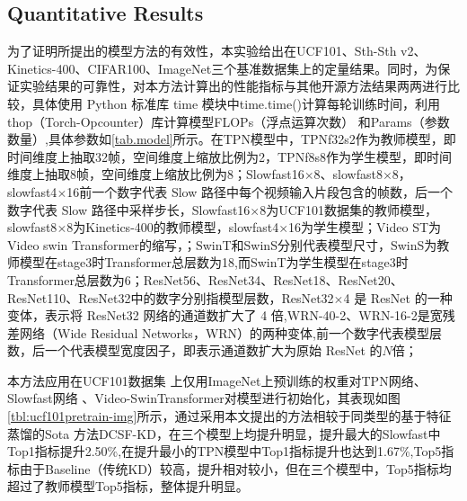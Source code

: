 \documentclass[10.5pt,letterpaper]{article}
\begin{document}
\subsection{ Quantitative Results}
为了证明所提出的模型方法的有效性，本实验给出在UCF101\cite{soomro-arxiv2012-ucf101}、Sth-Sth v2\cite{goyal-iccv2017-sthsth}、Kinetics-400\cite{kay-arXiv2017-kinetics}、CIFAR100\cite{wah-2011-cifar}、ImageNet\cite{krizhevsky-nips2012-imagenet}三个基准数据集上的定量结果。同时，为保证实验结果的可靠性，对本方法计算出的性能指标与其他开源方法结果两两进行比较，具体使用 Python 标准库 time 模块中time.time()计算每轮训练时间，利用thop（Torch-Opcounter）库计算模型FLOPs（浮点运算次数） 和Params（参数数量）,具体参数如\ref{tab.model}所示。在TPN\cite{yang-cvpr2020-temporal}模型中，TPNf32s2作为教师模型，即时间维度上抽取32帧，空间维度上缩放比例为2，TPNf8s8作为学生模型，即时间维度上抽取8帧，空间维度上缩放比例为8；Slowfast16$\times$8、slowfast8$\times$8，slowfast4$\times$16前一个数字代表 Slow 路径中每个视频输入片段包含的帧数，后一个数字代表 Slow 路径中采样步长，Slowfast16$\times$8为UCF101数据集的教师模型，slowfast8$\times$8为Kinetics-400的教师模型，slowfast4$\times$16为学生模型；Video ST为Video swin Transformer的缩写，；SwinT和SwinS分别代表模型尺寸，SwinS为教师模型在stage3时Transformer总层数为18,而SwinT为学生模型在stage3时Transformer总层数为6；ResNet56、ResNet34、ResNet18、ResNet20、ResNet110、ResNet32中的数字分别指模型层数，ResNet32$\times$4 是 ResNet 的一种变体，表示将 ResNet32 网络的通道数扩大了 4 倍,WRN-40-2、WRN-16-2是宽残差网络（Wide Residual Networks，WRN）的两种变体,前一个数字代表模型层数，后一个代表模型宽度因子，即表示通道数扩大为原始 ResNet 的$N$倍；

本方法应用在UCF101数据集\cite{soomro-arxiv2012-ucf101} 上仅用ImageNet上预训练的权重对TPN网络\cite{yang-cvpr2020-temporal}、Slowfast网络\cite{feichtenhofer-iccv2019-slowfast} 、Video-SwinTransformer\cite{liu-cvpr2022-video}对模型进行初始化，其表现如图\ref{tbl:ucf101pretrain-img}所示，通过采用本文提出的方法相较于同类型的基于特征蒸馏的Sota 方法DCSF-KD\cite{tao-aaai2025-channelkd}，在三个模型上均提升明显，提升最大的Slowfast中Top1指标提升2.50\%,在提升最小的TPN模型\cite{yang-cvpr2020-temporal}中Top1指标提升也达到1.67\%,Top5指标由于Baseline（传统KD\cite{geoffrey-arxiv2015-kd}）较高，提升相对较小，但在三个模型中，Top5指标均超过了教师模型Top5指标，整体提升明显。
\end{document}
